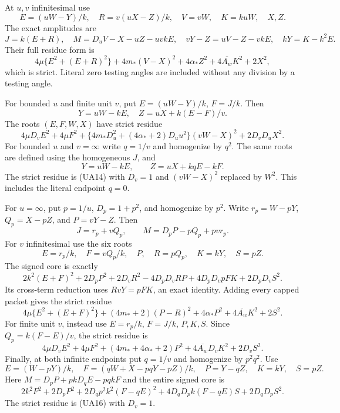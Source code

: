 At $u,v$ infinitesimal use
\[
 E=(uW-Y)/k,\quad R=v(uX-Z)/k,\quad V=vW,\quad K=kuW,
 \quad X,Z.
\]
The exact amplitudes are
\[
 J=k(E+R),\quad M=D_uV-X-uZ-uvkE,\quad
 vY-Z=uV-Z-vkE,\quad kY=K-k^2E.
\]
Their full residue form is
\[
 4\mu\{E^2+(E+R)^2\}+4m_*(V-X)^2+4\alpha_*Z^2
       +4\overline{A_w}K^2+2X^2,                    \tag{UA13}
\]
which is strict. Literal zero testing angles are included without
any division by a testing angle.

For bounded $u$ and finite unit $v$, put
$E=(uW-Y)/k$, $F=J/k$. Then
\[
 Y=uW-kE,\quad Z=uX+k(E-F)/v.
\]
The roots $(E,F,W,X)$ have strict residue
\[
 4\mu D_vE^2+4\mu F^2+
 \{4m_*D_u^2+(4\alpha_*+2)D_uu^2\}(vW-X)^2
 +2D_vD_uX^2.                                      \tag{UA14}
\]
For bounded $u$ and $v=\infty$ write $q=1/v$ and homogenize by $q^2$.
The same roots are defined using the homogeneous $J$, and
\[
 Y=uW-kE,\qquad Z=uX+kqE-kF.
\]
The strict residue is (UA14) with $D_v=1$ and $(vW-X)^2$ replaced
by $W^2$. This includes the literal endpoint $q=0$.

For $u=\infty$, put $p=1/u$, $D_p=1+p^2$, and homogenize by $p^2$.
Write $r_p=W-pY$, $Q_p=X-pZ$, and $P=vY-Z$. Then
\[
 J=r_p+vQ_p,\qquad M=D_pP-pQ_p+pv r_p.
\]
For $v$ infinitesimal use the six roots
\[
 E=r_p/k,\quad F=vQ_p/k,\quad P,\quad R=pQ_p,
 \quad K=kY,\quad S=pZ.
\]
The signed core is exactly
\[
 2k^2(E+F)^2+2D_pP^2+2D_vR^2-4D_pD_vRP
    +4D_pD_vpFK+2D_pD_vS^2.
\]
Its cross-term reduction uses $RvY=pFK$, an exact identity.
Adding every capped packet gives the strict residue
\[
 4\mu\{E^2+(E+F)^2\}+(4m_*+2)(P-R)^2
 +4\alpha_*P^2+4\overline{A_w}K^2+2S^2.             \tag{UA15}
\]
For finite unit $v$, instead use $E=r_p/k$, $F=J/k$, $P,K,S$.
Since $Q_p=k(F-E)/v$, the strict residue is
\[
 4\mu D_vE^2+4\mu F^2+(4m_*+4\alpha_*+2)P^2
 +4\overline{A_w}D_vK^2+2D_vS^2.                   \tag{UA16}
\]
Finally, at both infinite endpoints put $q=1/v$ and homogenize by
$p^2q^2$. Use
\[
 E=(W-pY)/k,\quad F=(qW+X-pqY-pZ)/k,\quad
 P=Y-qZ,\quad K=kY,\quad S=pZ.
\]
Here $M=D_pP+pkD_qE-pqkF$ and the entire signed core is
\[
 2k^2F^2+2D_pP^2+2D_qp^2k^2(F-qE)^2
 +4D_qD_pk(F-qE)S+2D_qD_pS^2.
\]
The strict residue is (UA16) with $D_v=1$.

